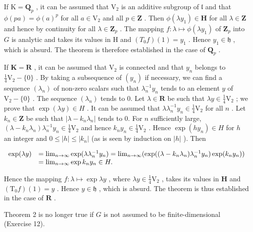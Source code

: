 If \(\mathrm{K} = \mathbf{Q}_p\) , it can be assumed that \(\mathrm{V}_2\) is an additive subgroup of \(\mathfrak{l}\) and that \(\phi (pa) = \phi (a)^p\) for all \(a\in \mathrm{V}_2\) and all \(p\in \mathbf{Z}\) . Then \(\phi (\lambda y_1)\in \mathbf{H}\) for all \(\lambda \in \mathbf{Z}\) and hence by continuity for all \(\lambda \in \mathbf{Z}_p\) . The mapping \(f\colon \lambda \mapsto \phi (\lambda y_1)\) of \(\mathbf{Z}_p\) into \(G\) is analytic and takes its values in H and \((T_0f)(1) = y_1\) . Hence \(y_{1}\in \mathfrak{h}\) , which is absurd. The theorem is therefore established in the case of \(\mathbf{Q}_p\) .

If \(\mathbf{K} = \mathbf{R}\) , it can be assumed that \(\mathrm{V}_2\) is connected and that \(y_{n}\) belongs to \(\frac{1}{4}\mathrm{V}_2 - \{0\}\) . By taking a subsequence of \((y_n)\) if necessary, we can find a sequence \((\lambda_n)\) of non-zero scalars such that \(\lambda_n^{-1}y_n\) tends to an element \(y\) of \(\mathrm{V}_2 - \{0\}\) . The sequence \((\lambda_n)\) tends to 0. Let \(\lambda \in \mathbf{R}\) be such that \(\lambda y \in \frac{1}{4}\mathrm{V}_2\) ; we prove that \(\exp (\lambda y) \in H\) . It can be assumed that \(\lambda\lambda_n^{-1}y_n \in \frac{1}{4}\mathrm{V}_2\) for all \(n\) . Let \(k_n \in \mathbf{Z}\) be such that \(|\lambda - k_n\lambda_n|\) tends to 0. For \(n\) sufficiently large, \((\lambda - k_n\lambda_n)\lambda_n^{-1}y_n \in \frac{1}{4}\mathrm{V}_2\) and hence \(k_n y_n \in \frac{1}{4}\mathrm{V}_2\) . Hence \(\exp (hy_n) \in H\) for \(h\) an integer and \(0 \leqslant |h| \leqslant |k_n|\) (as is seen by induction on \(|h|\) ). Then

\[
\begin{array}{r l} \exp (\lambda y) & = \lim _ {n \to \infty} \exp (\lambda \lambda_ {n} ^ {- 1} y _ {n}) = \lim _ {n \to \infty} (\exp ((\lambda - k _ {n} \lambda_ {n}) \lambda_ {n} ^ {- 1} y _ {n}) \exp (k _ {n} y _ {n})) \\ & = \lim _ {n \to \infty} \exp k _ {n} y _ {n} \in H. \end{array}
\]

Hence the mapping \(f \colon \lambda \mapsto \exp \lambda y\) , where \(\lambda y \in \frac{1}{4} \mathrm{V}_2\) , takes its values in \(\mathbf{H}\) and \((\mathrm{T}_0f)(1) = y\) . Hence \(y \in \mathfrak{h}\) , which is absurd. The theorem is thus established in the case of \(\mathbf{R}\) .

Theorem 2 is no longer true if \(G\) is not assumed to be finite-dimensional (Exercise 12).

